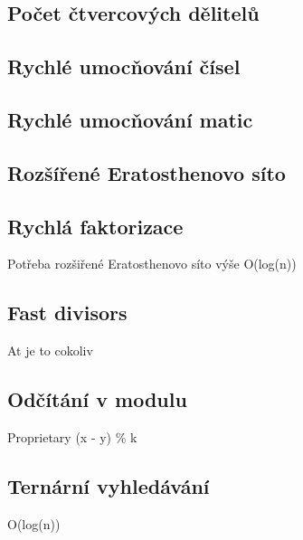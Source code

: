 \documentclass[10pt, a4paper, twoside]{article}
\begin{document}
\subsection{Počet čtvercových dělitelů}


\subsection{Rychlé umocňování čísel}



\subsection{Rychlé umocňování matic}


\subsection{Rozšířené Eratosthenovo síto}


\subsection{Rychlá faktorizace}
Potřeba rozšiřené Eratosthenovo síto výše
O(log(n))


\subsection{Fast divisors}
At je to cokoliv


\subsection{Odčítání v modulu}
Proprietary (x - y) \% k


\subsection{Ternární vyhledávání}
O(log(n))

\end{document}
